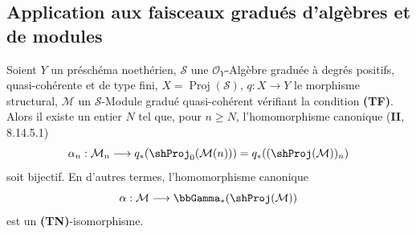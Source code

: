 \subsection{Application aux faisceaux gradués d'algèbres et de modules}
\label{subsection:III.2.3-fr}

\begin{theorem}[2.3.1]
\label{III.2.3.1-fr}
Soient $Y$ un préschéma noethérien, $\mathcal S$ une
$\mathcal O_Y$-Algèbre graduée à degrés positifs, quasi-cohérente et de
type fini, $X=\operatorname{Proj}(\mathcal S)$,
$q:X\to Y$ le morphisme structural, $\mathcal M$ un $\mathcal S$-Module
gradué quasi-cohérent vérifiant la condition \textup{\textbf{(TF)}}. Alors il existe
un entier $N$ tel que, pour $n\geq N$, l'homomorphisme canonique
\textup{(\textbf{II}, 8.14.5.1)}
\[
\alpha_n:\mathcal M_n\longrightarrow
q_*(\shProj_0(\mathcal M(n)))
=q_*((\shProj(\mathcal M))_n)
\]
soit bijectif. En d'autres termes, l'homomorphisme canonique
\[
\alpha:\mathcal M\longrightarrow\bbGamma_*(\shProj(\mathcal M))
\]
est un \textup{\textbf{(TN)}}-isomorphisme.
\end{theorem}


